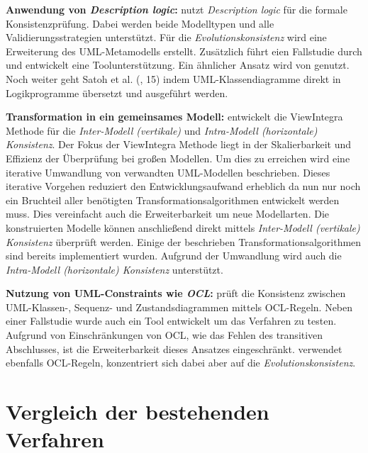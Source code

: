 \textbf{Anwendung von \emph{Description logic}:}
\cite{Mens2005} nutzt \emph{Description logic} für die formale Konsistenzprüfung.
Dabei werden beide Modelltypen und alle Validierungsstrategien unterstützt.
Für die \emph{Evolutionskonsistenz} wird eine Erweiterung des UML-Metamodells erstellt.
Zusätzlich führt \cite{Mens2005} eien Fallstudie durch und entwickelt eine Toolunterstützung.
Ein ähnlicher Ansatz wird von \cite{Simmonds2004} genutzt.
Noch weiter geht Satoh et al. (\cite{Usman2008}, 15) indem UML-Klassendiagramme direkt in Logikprogramme übersetzt und ausgeführt werden.

\textbf{Transformation in ein gemeinsames Modell:}
\cite{Egyed2001} entwickelt die ViewIntegra Methode für die  \emph{Inter-Modell (vertikale)} und \emph{Intra-Modell (horizontale) Konsistenz}.
Der Fokus der ViewIntegra Methode liegt in der Skalierbarkeit und Effizienz der Überprüfung bei großen Modellen.
Um dies zu erreichen wird eine iterative Umwandlung von verwandten UML-Modellen beschrieben.
Dieses iterative Vorgehen reduziert den Entwicklungsaufwand erheblich da nun nur noch ein Bruchteil aller benötigten Transformationsalgorithmen entwickelt werden muss.
Dies vereinfacht auch die Erweiterbarkeit um neue Modellarten.
Die konstruierten Modelle können anschließend direkt mittels \emph{Inter-Modell (vertikale) Konsistenz} überprüft werden.
Einige der beschrieben Transformationsalgorithmen sind bereits implementiert wurden.
Aufgrund der Umwandlung wird auch die \emph{Intra-Modell (horizontale) Konsistenz} unterstützt.

\textbf{Nutzung von UML-Constraints wie \emph{OCL}:}
\cite{Egyed2006} prüft die Konsistenz zwischen UML-Klassen-, Sequenz- und Zustandsdiagrammen mittels OCL-Regeln.
Neben einer Fallstudie wurde auch ein Tool entwickelt um das Verfahren zu testen.
Aufgrund von Einschränkungen von OCL, wie das Fehlen des transitiven Abschlusses, ist die Erweiterbarkeit dieses Ansatzes eingeschränkt.
\cite{Briand2003} verwendet ebenfalls OCL-Regeln, konzentriert sich dabei aber auf die \emph{Evolutionskonsistenz}.

\section{Vergleich der bestehenden Verfahren}

